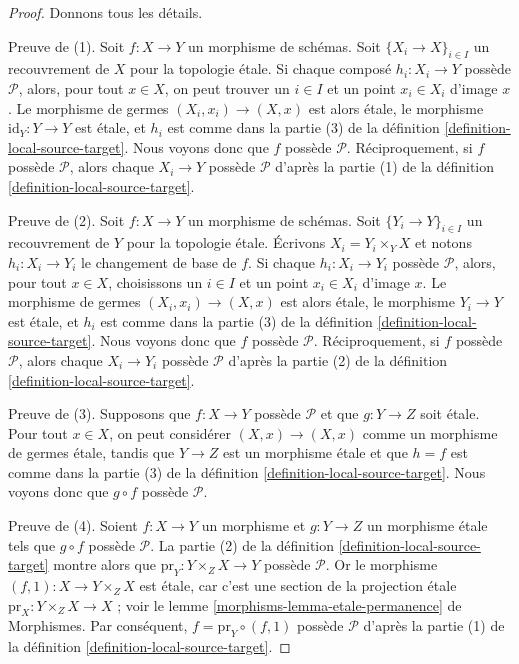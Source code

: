 \begin{proof}
Donnons tous les détails.

\medskip\noindent
Preuve de (1). Soit $f : X \to Y$ un morphisme de schémas.
Soit $\{X_i \to X\}_{i \in I}$ un recouvrement de $X$ pour la topologie
\'etale. Si chaque
composé $h_i : X_i \to Y$ possède $\mathcal{P}$, alors, pour tout $x \in X$,
on peut trouver un $i \in I$ et un point $x_i \in X_i$ d'image $x$. Le
morphisme de germes $(X_i, x_i) \to (X, x)$ est alors \'etale, le morphisme
$\text{id}_Y : Y \to Y$ est \'etale, et $h_i$ est comme dans la partie (3) de
la définition \ref{definition-local-source-target}.
Nous voyons donc que $f$ possède $\mathcal{P}$.
Réciproquement, si $f$ possède $\mathcal{P}$, alors chaque $X_i \to Y$ possède
$\mathcal{P}$ d'après la partie (1) de la
définition \ref{definition-local-source-target}.

\medskip\noindent
Preuve de (2). Soit $f : X \to Y$ un morphisme de schémas.
Soit $\{Y_i \to Y\}_{i \in I}$ un recouvrement de $Y$ pour la topologie
\'etale.
Écrivons $X_i = Y_i \times_Y X$ et notons $h_i : X_i \to Y_i$ le changement
de base de $f$. Si chaque $h_i : X_i \to Y_i$ possède $\mathcal{P}$, alors,
pour tout $x \in X$, choisissons un $i \in I$ et un point $x_i \in X_i$
d'image $x$. Le morphisme de germes $(X_i, x_i) \to (X, x)$ est alors
\'etale, le morphisme $Y_i \to Y$ est \'etale, et $h_i$ est comme dans la
partie (3) de la définition \ref{definition-local-source-target}.
Nous voyons donc que $f$ possède $\mathcal{P}$.
Réciproquement, si $f$ possède $\mathcal{P}$, alors chaque $X_i \to Y_i$
possède $\mathcal{P}$ d'après la partie (2) de la
définition \ref{definition-local-source-target}.

\medskip\noindent
Preuve de (3). Supposons que $f : X \to Y$ possède $\mathcal{P}$ et que
$g : Y \to Z$ soit \'etale. Pour tout $x \in X$, on peut considérer
$(X, x) \to (X, x)$ comme un morphisme de germes \'etale, tandis que
$Y \to Z$ est un morphisme \'etale et que $h = f$ est comme dans la partie (3)
de la définition \ref{definition-local-source-target}.
Nous voyons donc que $g \circ f$ possède $\mathcal{P}$.

\medskip\noindent
Preuve de (4). Soient $f : X \to Y$ un morphisme et $g : Y \to Z$ un
morphisme \'etale tels que $g \circ f$ possède $\mathcal{P}$. La partie (2) de
la définition \ref{definition-local-source-target} montre alors que
$\text{pr}_Y : Y \times_Z X \to Y$ possède $\mathcal{P}$. Or le morphisme
$(f, 1) : X \to Y \times_Z X$ est \'etale, car c'est une section de la
projection \'etale $\text{pr}_X : Y \times_Z X \to X$ ; voir le
lemme \ref{morphisms-lemma-etale-permanence} de Morphismes.
Par conséquent, $f = \text{pr}_Y \circ (f, 1)$ possède $\mathcal{P}$ d'après
la partie (1) de la définition \ref{definition-local-source-target}.
\end{proof}

